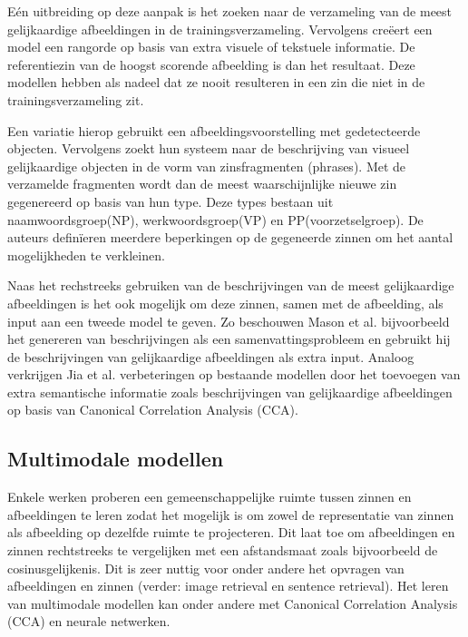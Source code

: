 E\'en uitbreiding op deze aanpak is het zoeken naar de verzameling van de meest gelijkaardige afbeeldingen in de trainingsverzameling. Vervolgens cre\"eert een model een rangorde op basis van extra visuele of tekstuele informatie. De referentiezin van de hoogst scorende afbeelding is dan het resultaat\cite{Devlin2015a,Hodosh2013,Ordonez2011,Oliva2006}. 
Deze modellen hebben als nadeel dat ze nooit resulteren in een zin die niet in de trainingsverzameling zit.

Een variatie\cite{Gupta2012,Kuznetsova2012} hierop gebruikt een afbeeldingsvoorstelling met gedetecteerde objecten. Vervolgens zoekt hun systeem naar de beschrijving van visueel gelijkaardige objecten in de vorm van zinsfragmenten (phrases). Met de verzamelde fragmenten wordt dan de meest waarschijnlijke nieuwe zin gegenereerd op basis van hun type. Deze types bestaan uit naamwoordsgroep(NP), werkwoordsgroep(VP) en PP(voorzetselgroep). De auteurs defin\"ieren meerdere beperkingen op de gegeneerde zinnen om het aantal mogelijkheden te verkleinen.

Naas het rechstreeks gebruiken van de beschrijvingen van de meest gelijkaardige afbeeldingen is het ook mogelijk om deze zinnen, samen met de afbeelding, als input aan een tweede model te geven. Zo beschouwen Mason et al.\cite{Mason2014} bijvoorbeeld het genereren van beschrijvingen als een samenvattingsprobleem en gebruikt hij de beschrijvingen van gelijkaardige afbeeldingen als extra input. Analoog verkrijgen Jia et al.\cite{Fernando2015} verbeteringen op bestaande modellen door het toevoegen van extra semantische informatie zoals beschrijvingen van gelijkaardige afbeeldingen op basis van Canonical Correlation Analysis (CCA).
 
\subsection{Multimodale modellen}
Enkele werken proberen een gemeenschappelijke ruimte tussen zinnen en afbeeldingen te leren zodat het mogelijk is om zowel de representatie van zinnen als afbeelding op dezelfde ruimte te projecteren. Dit laat toe om afbeeldingen en zinnen rechtstreeks te vergelijken met een afstandsmaat zoals bijvoorbeeld de cosinusgelijkenis. Dit is zeer nuttig voor onder andere het opvragen van afbeeldingen en zinnen (verder: image retrieval en sentence retrieval). Het leren van multimodale modellen kan onder andere met Canonical Correlation Analysis (CCA)\cite{Hodosh2013} en neurale netwerken\cite{Mao2014,Karpathy2014,Kiros2013}. 

